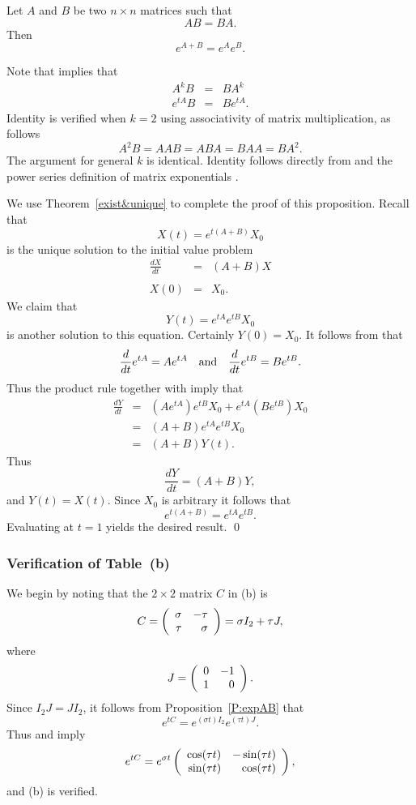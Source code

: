 \begin{prop}  \label{P:expAB}
Let $A$ and $B$ be two $n\times n$ matrices such that
\begin{equation} \label{e:AB=BA}
AB = BA.
\end{equation}
Then
\[
e^{A+B} = e^A e^B.
\]
\end{prop} 

\proof  Note that  implies that
\begin{eqnarray}
A^kB    & = & BA^k  \label{e:AkB=BAk}\\
e^{tA}B & = & Be^{tA}. \label{e:etAB=BetA}
\end{eqnarray}
Identity  is verified when $k=2$ using
associativity of matrix multiplication, as follows
\[
A^2B = AAB = ABA = BAA = BA^2.
\]
The argument for general $k$ is identical.  Identity
 follows directly from  and
the power series definition of matrix exponentials .

We use Theorem~\ref{exist&unique}  to complete the proof of this
proposition.  Recall that
\[
X(t) = e^{t(A+B)}X_0
\]
is the unique solution to the initial value problem
\begin{eqnarray*}
\frac{dX}{dt} & = & (A+B)X \\ \\
X(0) & = & X_0.
\end{eqnarray*}
We claim that
\[
Y(t) = e^{tA}e^{tB}X_0
\]
is another solution to this equation.  Certainly $Y(0)=X_0$.  It
follows from  that
\[
\frac{d}{dt}e^{tA} = Ae^{tA} \quad\mbox{and}\quad \frac{d}{dt}e^{tB} = Be^{tB}.
\]
Thus the product rule together with  imply that
\begin{eqnarray*}
\frac{dY}{dt} & = & \left(Ae^{tA}\right)e^{tB}X_0 +
e^{tA}\left(Be^{tB}\right)X_0 \\
& = & (A+B) e^{tA} e^{tB} X_0\\
& = & (A+B)Y(t).
\end{eqnarray*}
Thus
\[
\frac{dY}{dt} = (A+B)Y,
\]
and $Y(t)=X(t)$.  Since $X_0$ is arbitrary it follows that
\[
e^{t(A+B)} = e^{tA}e^{tB}.
\]
Evaluating at $t=1$ yields the desired result.  \qed

\subsubsection{Verification of Table~\protect{\ref{T:3sys}}(b)}

We begin by noting that the $2\times 2$ matrix $C$ in (b) is
\[
C = \left(\begin{array}{rr} \sigma & -\tau\\ \tau &\sigma\end{array}\right) = \sigma I_2 + \tau J,
\]
where
\[
J= \left(\begin{array}{rr} 0 & -1\\ 1 &0\end{array}\right).
\]
Since $I_2J=JI_2$, it follows from Proposition~\ref{P:expAB} that
\[
e^{tC} = e^{(\sigma t)I_2} e^{(\tau t)J}.
\]
Thus  and  imply
\begin{equation}  \label{e:exprotation}
e^{tC} = e^{\sigma t}
\left(\begin{array}{rr} \cos(\tau t) & -\sin(\tau t)\\ \sin(\tau t) &\cos(\tau t)\end{array}\right),
\end{equation}
and (b) is verified.

